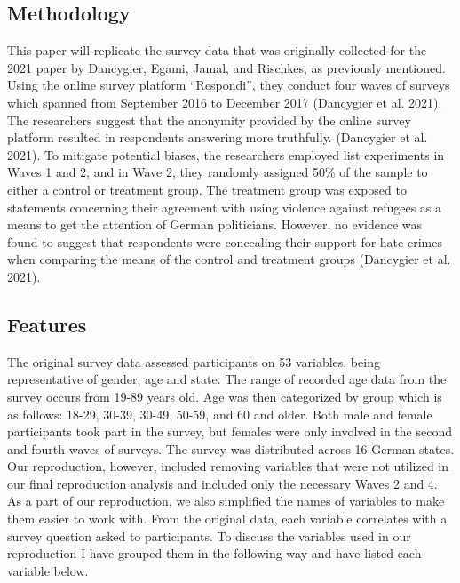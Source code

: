\documentclass[
]{article}
\begin{document}
\hypertarget{methodology}{%
\subsection{Methodology}\label{methodology}}

This paper will replicate the survey data that was originally collected
for the 2021 paper by Dancygier, Egami, Jamal, and Rischkes, as
previously mentioned. Using the online survey platform ``Respondi'',
they conduct four waves of surveys which spanned from September 2016 to
December 2017 (Dancygier et al. 2021). The researchers suggest that the
anonymity provided by the online survey platform resulted in respondents
answering more truthfully. (Dancygier et al. 2021). To mitigate
potential biases, the researchers employed list experiments in Waves 1
and 2, and in Wave 2, they randomly assigned 50\% of the sample to
either a control or treatment group. The treatment group was exposed to
statements concerning their agreement with using violence against
refugees as a means to get the attention of German politicians. However,
no evidence was found to suggest that respondents were concealing their
support for hate crimes when comparing the means of the control and
treatment groups (Dancygier et al. 2021).

\hypertarget{features}{%
\subsection{Features}\label{features}}

The original survey data assessed participants on 53 variables, being
representative of gender, age and state. The range of recorded age data
from the survey occurs from 19-89 years old. Age was then categorized by
group which is as follows: 18-29, 30-39, 30-49, 50-59, and 60 and older.
Both male and female participants took part in the survey, but females
were only involved in the second and fourth waves of surveys. The survey
was distributed across 16 German states. Our reproduction, however,
included removing variables that were not utilized in our final
reproduction analysis and included only the necessary Waves 2 and 4. As
a part of our reproduction, we also simplified the names of variables to
make them easier to work with. From the original data, each variable
correlates with a survey question asked to participants. To discuss the
variables used in our reproduction I have grouped them in the following
way and have listed each variable below.
\end{document}
